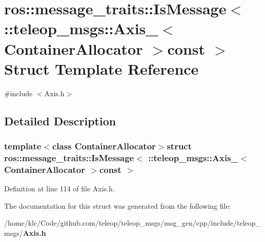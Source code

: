 \section{ros::message\_\-traits::IsMessage$<$ ::teleop\_\-msgs::Axis\_\-$<$ ContainerAllocator $>$const $>$ Struct Template Reference}
\label{structros_1_1message__traits_1_1IsMessage_3_01_1_1teleop__msgs_1_1Axis___3_01ContainerAllocator_01_4const_01_01_4}


{\ttfamily \#include $<$Axis.h$>$}



\subsection{Detailed Description}
\subsubsection*{template$<$class ContainerAllocator$>$struct ros::message\_\-traits::IsMessage$<$ ::teleop\_\-msgs::Axis\_\-$<$ ContainerAllocator $>$const  $>$}



Definition at line 114 of file Axis.h.



The documentation for this struct was generated from the following file:\begin{DoxyCompactItemize}
\item 
/home/klc/Code/github.com/teleop/teleop\_\-msgs/msg\_\-gen/cpp/include/teleop\_\-msgs/{\bf Axis.h}\end{DoxyCompactItemize}
